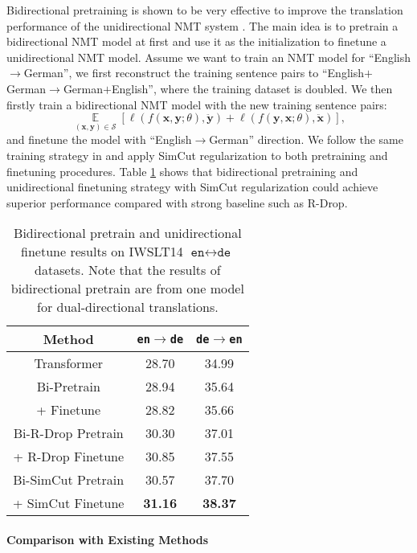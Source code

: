 \documentclass[11pt]{article}
\begin{document}
Bidirectional pretraining is shown to be very effective to improve the translation performance of the unidirectional NMT system \cite{ding2021improving, xu-etal-2021-bert}. The main idea is to pretrain a bidirectional NMT model at first and use it as the initialization to finetune a unidirectional NMT model. Assume we want to train an NMT model for ``English$\rightarrow$German'', we first reconstruct the training sentence pairs to ``English$+$German$\rightarrow$German$+$English'', where the training dataset is doubled. We then firstly train a bidirectional NMT model with the new training sentence pairs:
\begin{equation}
\mathop{\mathbb{E}}\limits_{(\mathbf{x}, \mathbf{y}) \in \mathcal{S}} [\ell(f(\mathbf{x}, \mathbf{y}; \theta), \ddot{\mathbf{y}}) + \ell(f(\mathbf{y}, \mathbf{x}; \theta), \ddot{\mathbf{x}})],
\end{equation}
and finetune the model with ``English$\rightarrow$German'' direction. We follow the same training strategy in \citet{ding2021improving} and apply SimCut regularization to both pretraining and finetuning procedures. Table \ref{bit} shows that bidirectional pretraining and unidirectional finetuning strategy with SimCut regularization could achieve superior performance compared with strong baseline such as R-Drop.  

\begin{table}
\centering
\begin{tabular}{c|c|c}
\hline
Method & \texttt{en}$\rightarrow$\texttt{de} & \texttt{de}$\rightarrow$\texttt{en} \\
\hline\hline
Transformer & 28.70 & 34.99 \\
\hline
Bi-Pretrain & 28.94 & 35.64 \\
+ Finetune & 28.82 & 35.66 \\
\hline
Bi-R-Drop Pretrain & 30.30 & 37.01 \\
+ R-Drop Finetune & 30.85 & 37.55 \\
\hline
Bi-SimCut Pretrain & 30.57 & 37.70 \\
+ SimCut Finetune & \bf 31.16 & \bf 38.37 \\
\end{tabular}
\caption{Bidirectional pretrain and unidirectional finetune results on IWSLT14 $\texttt{en}\leftrightarrow\texttt{de}$ datasets. Note that the results of bidirectional pretrain are from one model for dual-directional translations. \label{bit}}
\end{table}


\paragraph{Comparison with Existing Methods}
\end{document}
